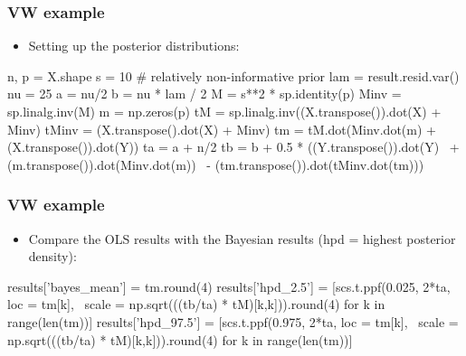 \documentclass[xcolor=table,10pt]{beamer}
\begin{document}
\begin{frame}[fragile]
  \frametitle{VW example}
  \begin{itemize}
  \item Setting up the posterior distributions:
  \end{itemize}
  {\scriptsize%
  \begin{pyconsole}[vw][frame=single]
n, p = X.shape
s = 10 # relatively non-informative prior
lam = result.resid.var()
nu = 25
a = nu/2
b = nu * lam / 2
M = s**2 * sp.identity(p)
Minv = sp.linalg.inv(M)
m = np.zeros(p)
tM = sp.linalg.inv((X.transpose()).dot(X) + Minv)
tMinv = (X.transpose().dot(X) + Minv)
tm = tM.dot(Minv.dot(m) + (X.transpose()).dot(Y))
ta = a + n/2
tb = b + 0.5 * ((Y.transpose()).dot(Y) \
                + (m.transpose()).dot(Minv.dot(m)) \
                - (tm.transpose()).dot(tMinv.dot(tm)))
\end{pyconsole}
}
\end{frame}


\begin{frame}[fragile]
  \frametitle{VW example}
  \begin{itemize}
  \item Compare the OLS results with the Bayesian results (hpd =
    highest posterior density):
  \end{itemize}
  {\scriptsize%
\begin{pyconsole}[vw][frame=single]
results['bayes_mean'] = tm.round(4)
results['hpd_2.5'] = [scs.t.ppf(0.025, 2*ta, loc = tm[k], \
      scale = np.sqrt(((tb/ta) * tM)[k,k])).round(4) for k in range(len(tm))]
results['hpd_97.5'] = [scs.t.ppf(0.975, 2*ta, loc = tm[k], \
      scale = np.sqrt(((tb/ta) * tM)[k,k])).round(4) for k in range(len(tm))]
\end{pyconsole}
}
\end{frame}
\end{document}
